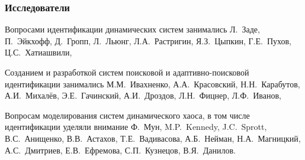 \documentclass[10pt,utf8]{beamer}
\begin{document}

\begin{frame}
  \frametitle{Исследователи}

  Вопросами идентификации динамических систем занимались
  Л.~Заде,
  П.~Эйкхофф,
  Д.~Гропп,
  Л.~Льюнг,
  Л.А.~Растригин,
  Я.З.~Цыпкин,
  Г.Е.~Пухов,
  Ц.С.~Хатиашвили,

  \vfill


  Созданием и разработкой систем поисковой и адаптивно-поисковой идентификации занимались
  М.М.~Ивахненко,
  А.А.~Красовский,
  Н.Н.~Карабутов,
  А.И.~Михалёв,
  Э.Е.~Гачинский,
  А.И.~Дроздов,
  Л.Н.~Фицнер,
  Л.Ф.~Иванов,

  \vfill

  Вопросам моделирования систем динамического хаоса, в том числе идентификации уделяли внимание
  Ф.~Мун,
  M.P.~Kennedy,
  J.C.~Sprott,
  В.С.~Анищенко,
  В.В.~Астахов,
  Т.Е.~Вадивасова,
  А.Б.~Нейман,
  Н.А.~Магницкий,
  А.С.~Дмитриев,
  Е.В.~Ефремова,
  С.П.~Кузнецов,
  В.Я.~Данилов.



\end{frame}

\end{document}
